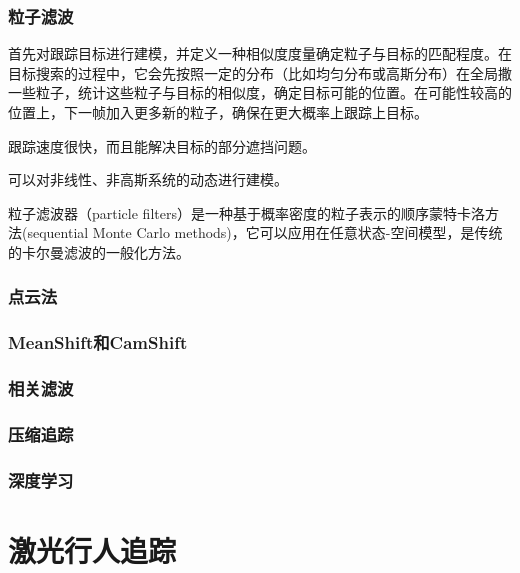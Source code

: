 \subsubsection{粒子滤波}
  首先对跟踪目标进行建模，并定义一种相似度度量确定粒子与目标的匹配程度。在目标搜索的过程中，它会先按照一定的分布（比如均匀分布或高斯分布）在全局撒一些粒子，统计这些粒子与目标的相似度，确定目标可能的位置。在可能性较高的位置上，下一帧加入更多新的粒子，确保在更大概率上跟踪上目标。

  跟踪速度很快，而且能解决目标的部分遮挡问题。

  可以对非线性、非高斯系统的动态进行建模。

  粒子滤波器（particle filters）是一种基于概率密度的粒子表示的顺序蒙特卡洛方法(sequential Monte Carlo methods)，它可以应用在任意状态-空间模型，是传统的卡尔曼滤波的一般化方法\cite{arulampalam2002tutorial}。

\subsubsection{点云法}

\subsubsection{MeanShift和CamShift}

\subsubsection{相关滤波}

\subsubsection{压缩追踪}

\subsubsection{深度学习}

\section{激光行人追踪}


